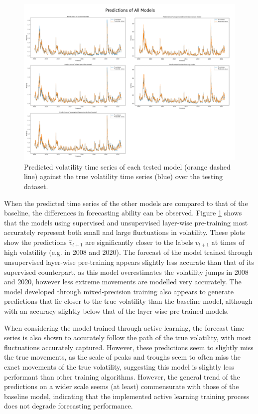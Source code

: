 \documentclass[a4paper, 11pt]{report}
\begin{document}
    \begin{figure}[ht]
        \centering
        \includegraphics[width=\textwidth]{results/all-predictions.png}
        \caption{\centering Predicted volatility time series of each tested model (orange dashed line) against the true volatility time series (blue) over the testing dataset.}
        \label{fig: predictions}
    \end{figure}

    When the predicted time series of the other models are compared to that of the baseline, the differences in forecasting ability can be observed. Figure \ref{fig: predictions} shows that the models using supervised and unsupervised layer-wise pre-training most accurately represent both small and large fluctuations in volatility. These plots show the predictions $\hat{v}_{t+1}$ are significantly closer to the labels $v_{t+1}$ at times of high volatility (e.g. in 2008 and 2020). The forecast of the model trained through unsupervised layer-wise pre-training appears slightly less accurate than that of its supervised counterpart, as this model overestimates the volatility jumps in 2008 and 2020, however less extreme movements are modelled very accurately. The model developed through mixed-precision training also appears to generate predictions that lie closer to the true volatility than the baseline model, although with an accuracy slightly below that of the layer-wise pre-trained models.

    When considering the model trained through active learning, the forecast time series is also shown to accurately follow the path of the true volatility, with most fluctuations accurately captured. However, these predictions seem to slightly miss the true movements, as the scale of peaks and troughs seem to often miss the exact movements of the true volatility, suggesting this model is slightly less performant than other training algorithms. However, the general trend of the predictions on a wider scale seems (at least) commensurate with those of the baseline model, indicating that the implemented active learning training process does not degrade forecasting performance.
\end{document}
